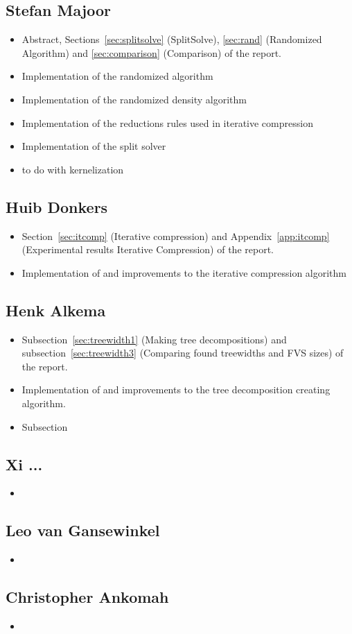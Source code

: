 \subsection{Stefan Majoor}
\begin{itemize}
 \item Abstract, Sections~\ref{sec:splitsolve} (SplitSolve), \ref{sec:rand} (Randomized Algorithm) and \ref{sec:comparison} (Comparison) of the report.
 \item Implementation of the randomized algorithm
 \item Implementation of the randomized density algorithm
 \item Implementation of the reductions rules used in iterative compression
 \item Implementation of the split solver
 \item {} to do with kernelization
\end{itemize}

\subsection{Huib Donkers}
\begin{itemize}
 \item Section~\ref{sec:itcomp} (Iterative compression) and Appendix~\ref{app:itcomp} (Experimental results Iterative Compression) of the report.
 \item Implementation of and improvements to the iterative compression algorithm
\end{itemize}

\subsection{Henk Alkema}
\begin{itemize}
 \item Subsection~\ref{sec:treewidth1} (Making tree decompositions) and subsection~\ref{sec:treewidth3} (Comparing found treewidths and FVS sizes) of the report.
 \item Implementation of and improvements to the tree decomposition creating algorithm.
 \item Subsection
\end{itemize}

\subsection{Xi ...}
\begin{itemize}
 \item 
\end{itemize}

\subsection{Leo van Gansewinkel}
\begin{itemize}
 \item 
\end{itemize}

\subsection{Christopher Ankomah}
\begin{itemize}
 \item 
\end{itemize}

